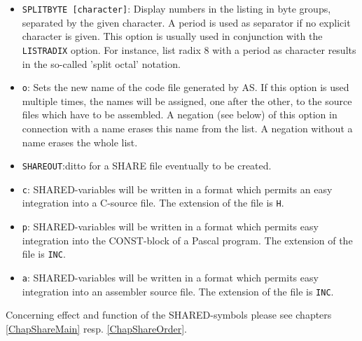 \documentclass[12pt,twoside]{report}
\newcommand{\tty}[1]{{\tt #1}}
\newcommand{\asname}{{AS}}
\begin{document}
\begin{itemize}
{      the listing.}
\item{\tty{SPLITBYTE [character]}: Display numbers in the listing in byte groups,
      separated by the given character.  A period is used as separator if
      no explicit character is given.  This option is usually used in conjunction
      with the \tty{LISTRADIX} option.  For instance, list radix 8 with a
      period as character results in the so-called 'split octal' notation.}
\item{\tty{o}: Sets the new name of the code file generated by \asname{}.  If this
      option is used multiple times, the names will be assigned, one
      after the other, to the source files which have to be
      assembled.  A negation (see below) of this option in
      connection with a name erases this name from the list.  A
      negation without a name erases the whole list.}
\item{\tty{SHAREOUT}:ditto for a SHARE file eventually to be created.}
\item{\tty{c}: SHARED-variables will be written in a format which permits
      an easy integration into a C-source file.  The extension of
      the file is \tty{H}.}
\item{\tty{p}: SHARED-variables will be written in a format which permits
      easy integration into the CONST-block of a Pascal program.
      The extension of the file is \tty{INC}.}
\item{\tty{a}: SHARED-variables will be written in a format which permits
      easy integration into an assembler source file. The
      extension of the file is \tty{INC}.}
\end{itemize}
Concerning effect and function of the SHARED-symbols please see
chapters \ref{ChapShareMain} resp. \ref{ChapShareOrder}.
\end{document}
